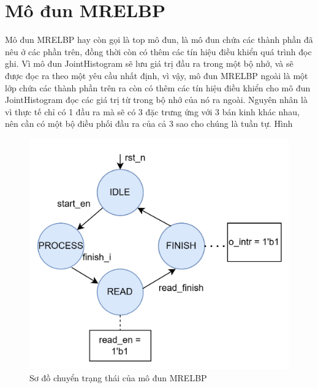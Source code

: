 \section{Mô đun MRELBP}
Mô đun MRELBP hay còn gọi là top mô đun, là mô đun chứa các thành phần đã nêu ở các phần trên, đồng thời còn có thêm các tín hiệu điều khiển quá trình đọc ghi. Vì mô đun JointHistogram sẽ lưu giá trị đầu ra trong một bộ nhớ, và sẽ được đọc ra theo một yêu cầu nhất định, vì vậy, mô đun MRELBP ngoài là một lớp chứa các thành phần trên ra còn có thêm các tín hiệu điều khiển cho mô đun JointHistogram đọc các giá trị từ trong bộ nhớ của nó ra ngoài. Nguyên nhân là vì thực tế chỉ có 1 đầu ra mà sẽ có 3 đặc trưng ứng với 3 bán kinh khác nhau, nên cần có một bộ điều phối đầu ra của cả 3 sao cho chúng là tuần tự. Hình 

\begin{figure}[!ht]
	\centering
	\begin{minipage}[t]{0.48\linewidth}
		\centering
		\includegraphics[width=\linewidth]{figures/topTrans.png}
		\caption{Sơ đồ chuyển trạng thái của mô đun MRELBP}
		\label{fig:topTrans}
	\end{minipage}
	\hfill
	\begin{minipage}[t]{0.48\linewidth}
		\centering

\end{minipage}
\end{figure}
